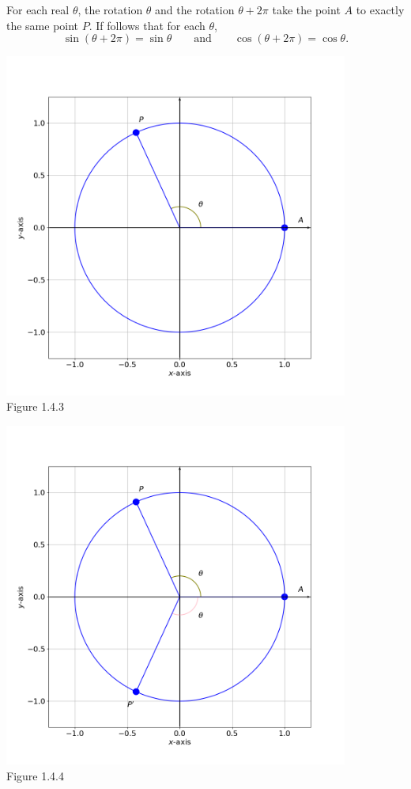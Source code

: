 \documentclass[11pt]{book}
\theoremstyle{break}
\theoremstyle{no_label}
\newcommand{\figtag}[1]{\\[-1.2em]Figure {#1}}
\numberwithin{equation}{section}
\begin{document}
For each real $\theta$, the rotation $\theta$ and the rotation $\theta+2\pi$ take the point $A$ to exactly the same point $P$. If follows that for each $\theta$, $$\sin(\theta+2\pi)=\sin\theta\qquad\text{and}\qquad\cos(\theta+2\pi)=\cos\theta.$$

\begin{center}
    \begin{minipage}{0.48\textwidth}
        \begin{center}
            \includegraphics[width=0.85\textwidth]{unit_circle_1.png}\figtag{1.4.3}
        \end{center}
    \end{minipage}
    \begin{minipage}{0.48\textwidth}
        \begin{center}
            \includegraphics[width=0.85\textwidth]{unit_circle_2.png}\figtag{1.4.4}
        \end{center}
    \end{minipage}
\end{center}
\end{document}
